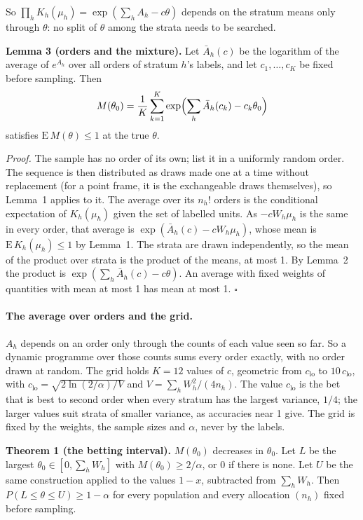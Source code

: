 \documentclass[11pt,a4paper]{article}
\begin{document}
So $\prod_h K_h(\mu_h) = \exp(\sum_h A_h - c\theta)$ depends on the stratum means only through $\theta$: no split of
$\theta$ among the strata needs to be searched.

\textbf{Lemma 3 (orders and the mixture).} Let $\bar A_h(c)$ be the logarithm of the average of $e^{A_h}$ over all
orders of stratum $h$'s labels, and let $c_1, \dots, c_K$ be fixed before sampling. Then
\begin{equation}
  M(\theta_0) = \frac{1}{K} \sum_{k=1}^{K} \exp\Bigl(\sum_h \bar A_h(c_k) - c_k \theta_0\Bigr)
  \label{eq:proof-mixture}
\end{equation}
satisfies $\mathrm{E}\,M(\theta) \le 1$ at the true $\theta$.

\textit{Proof.} The sample has no order of its own; list it in a uniformly random order. The sequence is then
distributed as draws made one at a time without replacement (for a point frame, it is the exchangeable draws
themselves), so Lemma~1 applies to it. The average over its $n_h!$ orders is the conditional expectation of
$K_h(\mu_h)$ given the set of labelled units. As $-c W_h \mu_h$ is the same in every order, that average is
$\exp(\bar A_h(c) - c W_h \mu_h)$, whose mean is $\mathrm{E}\,K_h(\mu_h) \le 1$ by Lemma~1. The strata are drawn
independently, so the mean of the product over strata is the product of the means, at most 1. By Lemma~2 the product
is $\exp(\sum_h \bar A_h(c) - c\theta)$. An average with fixed weights of quantities with mean at most 1 has mean at
most 1. $\square$

\paragraph{The average over orders and the grid.} $A_h$ depends on an order only through the counts of each value
seen so far. So a dynamic programme over those counts sums every order exactly, with no order drawn at random. The
grid holds $K = 12$ values of $c$, geometric from $c_{\mathrm{lo}}$ to $10\,c_{\mathrm{lo}}$, with
$c_{\mathrm{lo}} = \sqrt{2 \ln(2/\alpha) / V}$ and $V = \sum_h W_h^2/(4 n_h)$. The value $c_{\mathrm{lo}}$ is the bet
that is best to second order when every stratum has the largest variance, $1/4$; the larger values suit strata of
smaller variance, as accuracies near 1 give. The grid is fixed by the weights, the sample sizes and $\alpha$, never
by the labels.

\textbf{Theorem 1 (the betting interval).} $M(\theta_0)$ decreases in $\theta_0$. Let $L$ be the largest
$\theta_0 \in [0, \sum_h W_h]$ with $M(\theta_0) \ge 2/\alpha$, or 0 if there is none. Let $U$ be the same
construction applied to the values $1 - x$, subtracted from $\sum_h W_h$. Then $P(L \le \theta \le U) \ge 1 - \alpha$
for every population and every allocation $(n_h)$ fixed before sampling.
\end{document}

